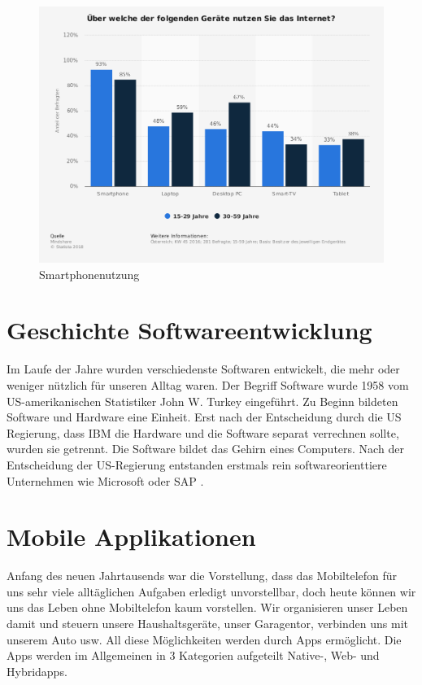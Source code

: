 \begin{figure}[h]
	\centering
	\includegraphics[width=12cm]{BilderAllgemein/SmartPhoneNutzung}\medskip
	\caption{Smartphonenutzung \cite{Geraetenutzung}}
	\label{fig:Smartphonenutzung}
\end{figure}

\section{Geschichte Softwareentwicklung}
Im Laufe der Jahre wurden verschiedenste Softwaren entwickelt, die mehr oder weniger nützlich für unseren Alltag waren.
Der Begriff Software wurde 1958 vom US-amerikanischen Statistiker John W. Turkey eingeführt.
Zu Beginn bildeten Software und Hardware eine Einheit. Erst nach der Entscheidung durch die US Regierung, dass IBM die Hardware und die Software separat verrechnen sollte, wurden sie getrennt.
Die Software bildet das Gehirn eines Computers. 
Nach der Entscheidung der US-Regierung entstanden erstmals rein softwareorienttiere Unternehmen wie Microsoft oder SAP \cite{Microsoft} \cite{SAP}. 


\section{Mobile Applikationen}
Anfang des neuen Jahrtausends war die Vorstellung, dass das Mobiltelefon für uns sehr viele alltäglichen Aufgaben erledigt unvorstellbar, doch heute können wir uns das Leben ohne 
Mobiltelefon kaum vorstellen.
Wir organisieren unser Leben damit und steuern unsere Haushaltsgeräte, unser Garagentor, verbinden uns mit unserem Auto usw. All diese Möglichkeiten werden durch Apps ermöglicht.
Die Apps werden im Allgemeinen in 3 Kategorien aufgeteilt
Native-, Web- und Hybridapps. 

